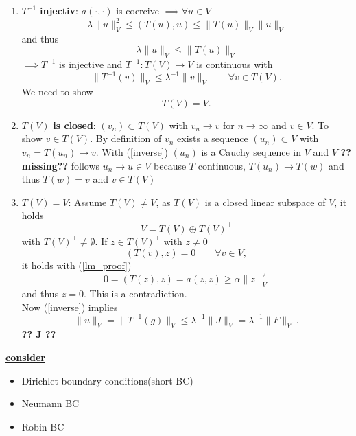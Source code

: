 \begin{enumerate}[=label=(\alph*)]
	\item  $T^{-1}$\textbf{ injectiv}: \enter
	$a(\cdot, \cdot)$ is coercive $\implies \forall u \in V$
	\begin{equation*}
		\lambda \|u\|^2_V \leq (T(u),u) \leq \|T(u)\|_V\|u\|_V
	\end{equation*}
	and thus 
	\begin{equation}\label{inverse}
		\lambda \|u\|_V \leq \|T(u)\|_V
	\end{equation}
	$\implies T^{-1}$ is injective and $T^{-1}: T(V) \to V$ is continuous with
	\begin{equation*}
		\|T^{-1}(v)\|_V \leq \lambda^{-1}\|v\|_V \qquad \forall v \in T(V). 
	\end{equation*}
	We need to show
	\begin{equation*}
		T(V) = V.
	\end{equation*}
	\item $T(V)$ \textbf{is closed}:\enter
	 $(v_n) \subset T(V)$ with $v_n \to v$ for $n \to \infty$ and $v \in V$. To show $v \in T(V)$. By definition of $v_n$ exists a sequence $(u_n) \subset V$ with $v_n = T(u_n) \to v$. With (\ref{inverse}) $(u_n)$ is a Cauchy sequence in $V$ and $V$ \textbf{??missing??} follows $u_n \to u \in V$ because $T$ continuous, $T(u_n) \to T(w)$ and thus $T(w)=v$ and $v \in T(V)$\enter
	\item $T(V) = V$:\enter
	 Assume $T(V) \neq V$, as $T(V)$ is a closed linear subspace of $V$, it holds 
	\begin{equation*}
		V = T(V) \oplus T(V)^\perp
	\end{equation*}
	with $T(V)^\perp \neq \emptyset$. If $z \in T(V)^\perp $ with $z \neq 0$
	\begin{equation*}
		(T(v),z) = 0 \qquad \forall v \in V,
	\end{equation*}
	it holds with (\ref{lm_proof}) 
	\begin{equation*}
		0 = (T(z),z) = a(z,z) \geq \alpha \|z\|^2_V
	\end{equation*}
	and thus $z = 0$. This is a contradiction.\\
	Now (\ref{inverse}) implies
	\begin{equation*}
		\|u\|_V = \|T^{-1}(g)\|_V \leq \lambda^{-1}\|J\|_V = \lambda^{-1}\|F\|_{V'}.
	\end{equation*}
	\textbf{?? J ??}
\end{enumerate}

\textbf{\underline{consider}}
\begin{itemize}
	\item Dirichlet boundary conditions(short BC)\enter
	\item Neumann BC\enter
	\item Robin BC
\end{itemize}



